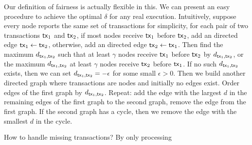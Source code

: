 \documentclass[runningheads]{llncs}
\begin{document}
Our definition of fairness is actually flexible in this. We can present an easy procedure to achieve the optimal $\delta$ for any real execution. Intuitively, suppose every node reports the same set of transactions for simplicity, for each pair of two transactions $\mathsf{tx}_1$ and $\mathsf{tx}_2$, if most nodes receive $\mathsf{tx}_1$ before $\mathsf{tx}_2$, add an directed edge $\mathsf{tx}_1\leftarrow \mathsf{tx}_2$, otherwise, add an directed edge $\mathsf{tx}_2\leftarrow\mathsf{tx}_1$.  Then find the maximum $d_{\mathsf{tx}_1,\mathsf{tx}_2}$ such that at least $\gamma$ nodes receive $\mathsf{tx}_1$ before $\mathsf{tx}_2$ by $d_{\mathsf{tx}_1,\mathsf{tx}_2}$, or the maximum $d_{\mathsf{tx}_1, \mathsf{tx}_2}$ at least $\gamma$ nodes receive $\mathsf{tx}_2$ before $\mathsf{tx}_1$.  If no such $d_{\mathsf{tx}_1,\mathsf{tx}_2}$ exists, then we can set $d_{\mathsf{tx}_1,\mathsf{tx}_2} = -\epsilon$ for some small $\epsilon>0$. Then we build another directed graph where transactions are nodes and initially no edges exist. Order edges of the first graph by $d_{\mathsf{tx}_1,\mathsf{tx}_2}$. Repeat: add the edge with the largest $d$ in the remaining edges of the first graph to the second graph, remove the edge from the first graph. If the second graph has a cycle, then we remove the edge with the smallest $d$ in the cycle. 

How to handle missing transactions? By only processing 

\begin{credits}
\subsubsection{\ackname} 
\subsubsection{\discintname}

\end{credits}
%
%
%


%
\end{document}
